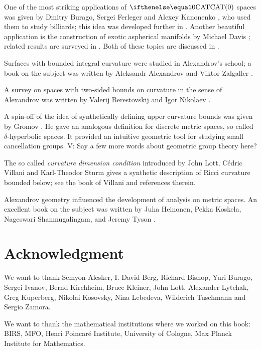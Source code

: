 One of the most striking applications of $\CAT0$ spaces was given by Dmitry Burago, Sergei Ferleger and Alexey Kanonenko \cite{BFK1},
who used them to study billiards; this idea was developed further in \cite{BFK2,BFK3,BFK4,BFK5,BFK6}. 
Another beautiful application is the construction of exotic aspherical manifolds by Michael Davis \cite{davis:aspherical}; related results are surveyed in \cite{davis:exotic,charney-davis}.
Both of these topics are discussed in \cite{AKP-CAT}.

Surfaces with bounded integral curvature were studied in Alexandrov's school;
a book on the subjcet was written by Aleksandr Alexandrov and Viktor Zalgaller \cite{aleksandrov-zalgaller}.

A survey on spaces with two-sided bounds on curvature in the sense of Alexandrov was written by Valerij Berestovskij and Igor Nikolaev \cite{berestovskii-nikolaev}.

A spin-off of the idea of synthetically defining upper curvature bounds 
was given by Gromov \cite{gromov:hyp-groups}. 
He gave an analogous definition for discrete metric spaces, so called $\delta$-hyperbolic spaces. 
It provided an intuitive geometric tool for studying small cancellation groups.
{\color{red} V: Say a few more words about geometric group theory here?}

The so called \emph{curvature dimension condition} introduced by John Lott, C\'edric Villani and Karl-Theodor Sturm gives a synthetic description of Ricci curvature bounded below; see the book of Villani \cite{villani} and references therein.

Alexandrov geometry influenced the development of analysis on metric spaces. 
An excellent book on the subject was written by Juha Heinonen, Pekka Koskela, Nageswari Shanmugalingam, and Jeremy Tyson \cite{HKST}.

\section*{Acknowledgment}
We want to thank 
Semyon Alesker,
I. David Berg,
Richard Bishop, 
Yuri Burago, 
Sergei Ivanov,
Bernd Kirchheim, 
Bruce Kleiner, 
John Lott,
Alexander Lytchak, 
Greg Kuperberg, 
Nikolai Kosovsky, 
Nina Lebedeva,
Wilderich Tuschmann and
Sergio Zamora.


We want to thank the mathematical institutions where we worked on this book:
BIRS, 
MFO, 
Henri Poincar\'{e} Institute,
University of Cologne, 
Max Planck Institute for Mathematics.




